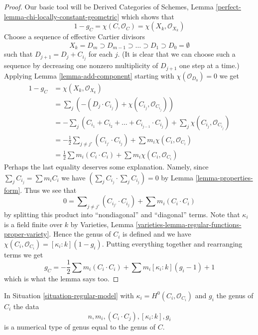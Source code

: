 \begin{proof}
Our basic tool will be Derived Categories of Schemes, Lemma
\ref{perfect-lemma-chi-locally-constant-geometric}
which shows that
$$
1 - g_C = \chi(C, \mathcal{O}_C) =
\chi(X_k, \mathcal{O}_{X_k})
$$
Choose a sequence of effective Cartier divisors
$$
X_k = D_m \supset D_{m - 1} \supset \ldots \supset D_1 \supset D_0 = \emptyset
$$
such that $D_{j + 1} = D_j + C_{i_j}$ for each $j$. (It is clear that
we can choose such a sequence by decreasing one nonzero multiplicity
of $D_{j + 1}$ one step at a time.) Applying Lemma \ref{lemma-add-component}
starting with $\chi(\mathcal{O}_{D_0}) = 0$ we get
\begin{align*}
1 - g_C
& =
\chi(X_k, \mathcal{O}_{X_k}) \\
& =
\sum\nolimits_j
\left(-(D_j \cdot C_{i_j}) +  \chi(C_{i_j}, \mathcal{O}_{C_{i_j}})\right) \\
& =
- \sum\nolimits_j
(C_{i_1} + C_{i_2} + \ldots + C_{i_{j - 1}} \cdot C_{i_j}) +
\sum\nolimits_j \chi(C_{i_j}, \mathcal{O}_{C_{i_j}}) \\
& =
-\frac{1}{2}\sum\nolimits_{j \not = j'} (C_{i_{j'}} \cdot C_{i_j}) +
\sum m_i \chi(C_i, \mathcal{O}_{C_i}) \\
& =
\frac{1}{2} \sum m_i(C_i \cdot C_i) + \sum m_i \chi(C_i, \mathcal{O}_{C_i})
\end{align*}
Perhaps the last equality deserves some explanation. Namely, since
$\sum_j C_{i_j} = \sum m_i C_i$ we have
$(\sum_j C_{i_j} \cdot \sum_j C_{i_j}) = 0$ by
Lemma \ref{lemma-properties-form}. Thus we see that
$$
0 = \sum\nolimits_{j \not = j'} (C_{i_{j'}} \cdot C_{i_j}) +
\sum m_i(C_i \cdot C_i)
$$
by splitting this product into ``nondiagonal'' and ``diagonal'' terms.
Note that $\kappa_i$ is a field finite over $k$ by
Varieties, Lemma \ref{varieties-lemma-regular-functions-proper-variety}.
Hence the genus of $C_i$ is defined and we have
$\chi(C_i, \mathcal{O}_{C_i}) = [\kappa_i : k](1 - g_i)$.
Putting everything together and rearranging terms we get
$$
g_C = - \frac{1}{2}\sum m_i(C_i \cdot C_i) +
\sum m_i[\kappa_i : k](g_i - 1) + 1
$$
which is what the lemma says too.
\end{proof}

\begin{lemma}
\label{lemma-numerical-type-of-model}
In Situation \ref{situation-regular-model} with
$\kappa_i = H^0(C_i, \mathcal{O}_{C_i})$ and $g_i$ the genus of $C_i$
the data
$$
n, m_i, (C_i \cdot C_j), [\kappa_i : k], g_i
$$
is a numerical type of genus equal to the genus of $C$.
\end{lemma}

